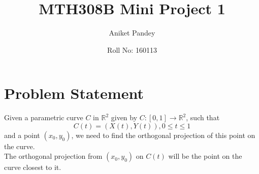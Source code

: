 \documentclass[12pt]{article}
\title{MTH308B Mini Project 1}
\author{Aniket Pandey}
\date{Roll No: 160113}
\begin{document}
\maketitle

\section*{Problem Statement}
Given a parametric curve $C$ in $\mathbb{R}^2$ given by $C:[0, 1] \rightarrow \mathbb{R}^2$, such that
    \begin{equation}
        C(t) = (X(t), Y(t)), 0 \leq t \leq 1
    \end{equation}
and a point $(x_0,y_0)$, we need to find the orthogonal projection of this point on the curve. \\
The orthogonal projection from $(x_0,y_0)$ on $C(t)$ will be the point on the curve closest to it.
\end{document}
